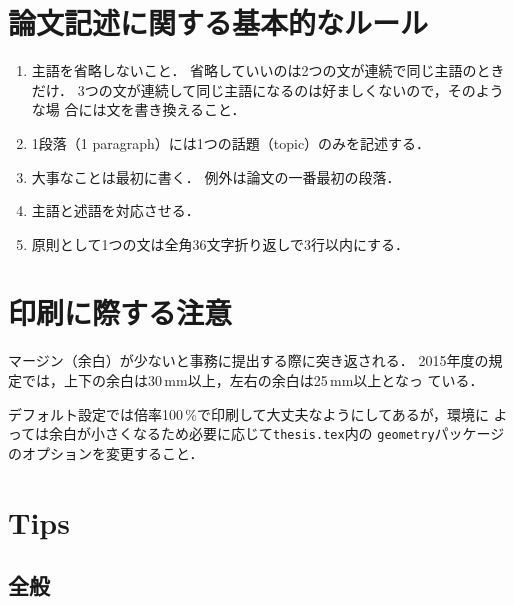 \section{論文記述に関する基本的なルール}

\begin{enumerate}
 \item 主語を省略しないこと．
       省略していいのは2つの文が連続で同じ主語のときだけ．
       3つの文が連続して同じ主語になるのは好ましくないので，そのような場
       合には文を書き換えること．
 \item 1段落（1 paragraph）には1つの話題（topic）のみを記述する．
 \item 大事なことは最初に書く．
       例外は論文の一番最初の段落．
 \item 主語と述語を対応させる．
 \item 原則として1つの文は全角36文字折り返しで3行以内にする．
\end{enumerate}

\section{印刷に際する注意}

マージン（余白）が少ないと事務に提出する際に突き返される．
2015年度の規定では，上下の余白は30\,mm以上，左右の余白は25\,mm以上となっ
ている．

デフォルト設定では倍率100\,\%で印刷して大丈夫なようにしてあるが，環境に
よっては余白が小さくなるため必要に応じて\texttt{thesis.tex}内の
\texttt{geometry}パッケージのオプションを変更すること．

\section{Tips}

\subsection{全般}

